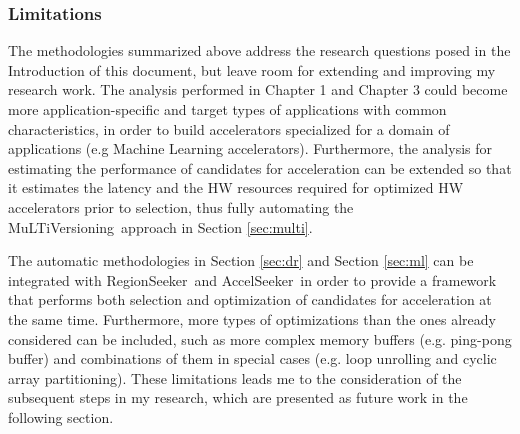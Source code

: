 \documentclass[]{usiinfthesis}
\newcommand{\aseeker}{{AccelSeeker}}
\newcommand{\rseeker}{{RegionSeeker}}
\newcommand{\multi}{MuLTiVersioning}
\begin{document}
\subsubsection{Limitations}

The methodologies summarized above address the research questions posed in the Introduction of this
document, but leave room for extending and improving my research work. 
The analysis performed in Chapter 1 and Chapter 3 could become more application-specific and target 
types of applications with common characteristics, in order to build accelerators specialized for a 
domain of applications (e.g Machine Learning accelerators).
Furthermore, the analysis for estimating the performance of candidates for acceleration can be extended
so that it estimates the latency and the HW resources required for optimized HW accelerators prior to 
selection, thus fully automating the \multi\ approach in Section \ref{sec:multi}.

The automatic methodologies in Section \ref{sec:dr} and Section \ref{sec:ml} can be 
integrated with \rseeker\ and \aseeker\ in order to provide a framework that performs both selection and
optimization of candidates for acceleration at the same time. Furthermore, more types of optimizations than the ones already considered
can be included, such as more complex memory buffers (e.g. ping-pong buffer) and combinations of them in special cases (e.g. loop 
unrolling and cyclic array partitioning).
These limitations leads me to the consideration of the subsequent steps in my research, which are presented as
future work in the following section.
\end{document}
